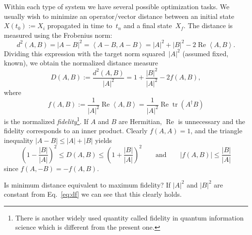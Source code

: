 \documentclass[aps, pra, a4paper, longbibliography]{revtex4}
\newcommand{\be}{\begin{equation}}
\newcommand{\ee}{\end{equation}}
\newcommand{\inprod}[2]{\left\langle #1, #2 \right\rangle}
\DeclareMathOperator{\tr}{tr}
\DeclareMathOperator{\re}{Re}
\begin{document}
Within each type of system we have several possible optimization tasks.
We usually wish to minimize an operator/vector distance between an
initial state $X(t_0) := X_i$ propagated in time to~$t_n$ and a final state~$X_f$.
The distance is measured using the Frobenius norm:
\be
d^2(A, B) = |A-B|^2
= \inprod{A-B}{A-B}
= |A|^2 +|B|^2 -2 \re \inprod{A}{B}.
\ee
Dividing this expression with the target norm squared~$|A|^2$ (assumed fixed,
known), we obtain the normalized distance measure
\be
\label{eq:df}
D(A,B)
:= \frac{d^2(A, B)}{|A|^2}
= 1 +\frac{|B|^2}{|A|^2} -2 f(A, B),
\ee
where
\be
f(A, B)
:= \frac{1}{|A|^2} \re \inprod{A}{B}
= \frac{1}{|A|^2} \re \tr(A^\dagger B)
\ee
is the normalized \emph{fidelity}\footnote{
There is another widely used quantity called fidelity in quantum information science which is different from the present one.}.
If $A$ and $B$ are Hermitian, $\re$ is unnecessary and the fidelity corresponds to an inner product.
Clearly $f(A, A) = 1$, and
the triangle inequality $|A-B| \le |A|+|B|$ yields
\be
\left(1 -\frac{|B|}{|A|} \right)^2 \le D(A, B) \le \left(1 +\frac{|B|}{|A|} \right)^2
\qquad \text{and} \qquad
|f(A, B)|
\le \frac{|B|}{|A|}
\ee
since $f(A, -B) = -f(A, B)$.


Is minimum distance equivalent to maximum fidelity?
If $|A|^2$ and $|B|^2$ are constant
from Eq.~\eqref{eq:df} we can see that this clearly holds.
\end{document}
